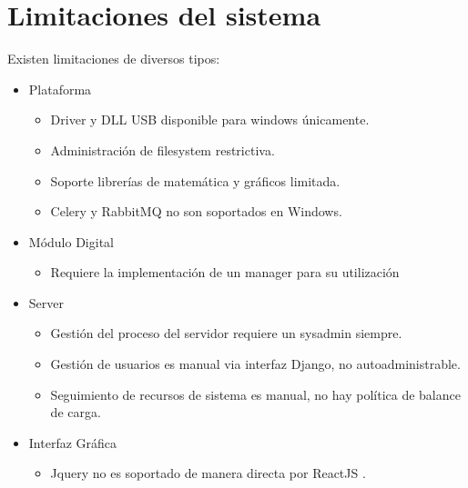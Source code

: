 \section{Limitaciones del sistema}

Existen limitaciones de diversos tipos:

\begin{itemize}
    \item Plataforma
    \begin{itemize}
    \item Driver y DLL USB disponible para windows \'unicamente.
    \item Administraci\'on de filesystem restrictiva. 
    \item Soporte librer\'ias de matem\'atica y gr\'aficos limitada.
    \item Celery y RabbitMQ no son soportados en Windows.\cite{celery} 
    \end{itemize}
    \item M\'odulo Digital
    \begin{itemize}
        \item Requiere la implementaci\'on de un manager para su utilizaci\'on
    \end{itemize}
    \item Server
    \begin{itemize}
        \item Gesti\'on del proceso del servidor requiere un sysadmin siempre.
        \item Gesti\'on de usuarios es manual via interfaz Django, no autoadministrable.
        \item Seguimiento de recursos de sistema es manual, no hay pol\'itica de balance de carga.
    \end{itemize}
    \item Interfaz Gr\'afica
    \begin{itemize} 
        \item Jquery no es soportado de manera directa por ReactJS\cite{react_jquery} .
    \end{itemize}
\end{itemize}
\newpage

